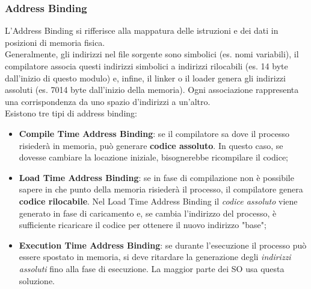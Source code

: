 \documentclass{article}
\begin{document}
			\subsubsection{Address Binding}
				L'Address Binding si rifferisce alla mappatura delle istruzioni e dei dati in posizioni di memoria fisica.
				\\Generalmente, gli indirizzi nel file sorgente sono simbolici (es. nomi variabili), il compilatore associa questi indirizzi simbolici a indirizzi rilocabili (es. 14 byte dall'inizio di questo modulo) e, infine, il linker o il loader genera gli indirizzi assoluti (es. 7014 byte dall'inizio della memoria). Ogni associazione rappresenta una corrispondenza da uno spazio d'indirizzi a un'altro.
				\\Esistono tre tipi di address binding:
				\begin{itemize}
					\item \textbf{Compile Time Address Binding}: se il compilatore sa dove il processo risiederà in memoria, può generare \textbf{codice assoluto}. In questo caso, se dovesse cambiare la locazione iniziale, bisognerebbe ricompilare il codice;
					\item \textbf{Load Time Address Binding}: se in fase di compilazione non è possibile sapere in che punto della memoria risiederà il processo, il compilatore genera \textbf{codice rilocabile}. Nel Load Time Address Binding il \textit{codice assoluto} viene generato in fase di caricamento e, se cambia l'indirizzo del processo, è sufficiente ricaricare il codice per ottenere il nuovo indirizzo "base";
					\item \textbf{Execution Time Address Binding}: se durante l'esecuzione il processo può essere spostato in memoria, si deve ritardare la generazione degli \textit{indirizzi assoluti} fino alla fase di esecuzione. La maggior parte dei SO usa questa soluzione.
				\end{itemize}
		
\end{document}

